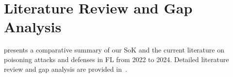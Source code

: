 \section{Literature Review and Gap Analysis}
\label{sec:related_work}
 presents a comparative summary of our SoK and the current literature on poisoning attacks and defenses in FL from 2022 to 2024. Detailed literature review and gap analysis are provided in~.

